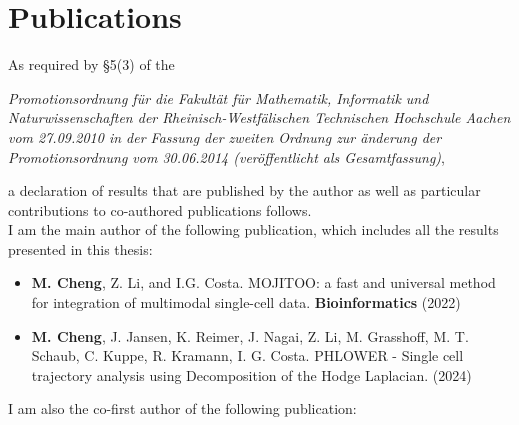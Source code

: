 \chapter*{Publications}
As required by \S 5(3) of the \\

\begin{addmargin}{0.05\textwidth}
\textit{Promotionsordnung f\"ur die Fakult\"at f\"ur Mathematik, Informatik und Naturwissenschaften der Rheinisch-Westf\"alischen Technischen Hochschule Aachen vom 27.09.2010 in der \linebreak Fassung der zweiten Ordnung zur \"anderung der Promotionsordnung vom 30.06.2014 \linebreak (ver\"offentlicht als Gesamtfassung)},
\end{addmargin} 
\vspace{0.5cm}

\noindent
a declaration of results that are published by the author as well as particular contributions to co-authored publications follows. \\


I am the main author of the following publication, which includes all the results presented in this
thesis:

\begin{addmargin}{0.02\textwidth}
	\begin{itemize}
	\item \textbf{M. Cheng}, Z. Li, and I.G. Costa. MOJITOO: a fast and universal method for integration of multimodal single-cell data. \textbf{Bioinformatics} (2022) \\
	\end{itemize}
\end{addmargin}


\begin{addmargin}{0.02\textwidth}
	\begin{itemize}
	\item \textbf{M. Cheng}, J. Jansen, K. Reimer, J. Nagai, Z. Li, M. Grasshoff, M. T. Schaub, C. Kuppe, R. Kramann,  I. G. Costa. PHLOWER - Single cell trajectory analysis using Decomposition of the Hodge Laplacian.  (2024)\\

	\end{itemize}
\end{addmargin}


I am also the co-first author of the following publication:\\


